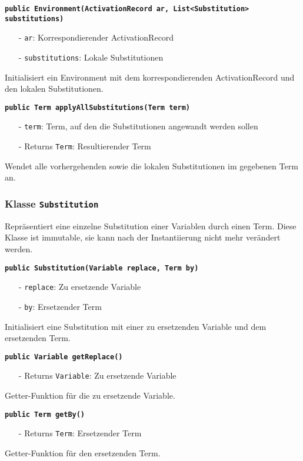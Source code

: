 \documentclass[parskip=full,11pt,twoside]{scrartcl}
\begin{document}
\textbf{\texttt{public Environment(ActivationRecord ar, List<Substitution>\\ substitutions)}}
\begin{itemize}[noitemsep]
	\item[-] \texttt{ar}: Korrespondierender ActivationRecord
	\item[-] \texttt{substitutions}: Lokale Substitutionen
\end{itemize}
Initialisiert ein Environment mit dem korrespondierenden ActivationRecord und den lokalen Substitutionen.

\textbf{\texttt{public Term applyAllSubstitutions(Term term)}}
\begin{itemize}[noitemsep]
	\item[-] \texttt{term}: Term, auf den die Substitutionen angewandt werden sollen
	\item[-] Returns \texttt{Term}: Resultierender Term
\end{itemize}
Wendet alle vorhergehenden sowie die lokalen Substitutionen im gegebenen Term an.

\subsubsection{Klasse \texttt{Substitution}}
Repräsentiert eine einzelne Substitution einer Variablen durch einen Term. Diese Klasse ist immutable, sie kann nach der Instantiierung nicht mehr verändert werden.

\textbf{\texttt{public Substitution(Variable replace, Term by)}}
\begin{itemize}[noitemsep]
	\item[-] \texttt{replace}: Zu ersetzende Variable
	\item[-] \texttt{by}: Ersetzender Term
\end{itemize}
Initialisiert eine Substitution mit einer zu ersetzenden Variable und dem ersetzenden Term.

\textbf{\texttt{public Variable getReplace()}}
\begin{itemize}[noitemsep]
	\item[-] Returns \texttt{Variable}: Zu ersetzende Variable
\end{itemize}
Getter-Funktion für die zu ersetzende Variable.

\textbf{\texttt{public Term getBy()}}
\begin{itemize}[noitemsep]
	\item[-] Returns \texttt{Term}: Ersetzender Term
\end{itemize}
Getter-Funktion für den ersetzenden Term.
\end{document}
